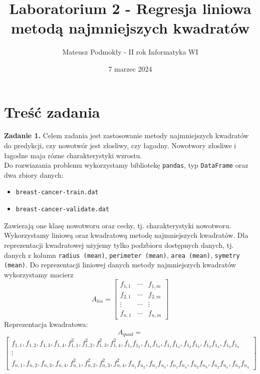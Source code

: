 \documentclass[11pt]{scrartcl}
\title{Laboratorium 2 - Regresja liniowa metodą najmniejszych kwadratów}
\author{Mateusz Podmokły - II rok Informatyka WI}
\date{7 marzec 2024}
\begin{document}
    \maketitle

    \section{Treść zadania}
    \textbf{Zadanie 1.} Celem zadania jest zastosowanie metody najmniejszych kwadratów
    do predykcji, czy nowotwór jest złosliwy, czy łagodny. Nowotwory złosliwe i łagodne
    maja rózne charakterystyki wzrostu. \\
    Do rozwiazania problemu wykorzystamy bibliotekę \texttt{pandas}, typ
    \texttt{DataFrame} oraz dwa zbiory danych:
    \begin{itemize}[label=--]
        \item \texttt{breast-cancer-train.dat}
        \item \texttt{breast-cancer-validate.dat}
    \end{itemize}
    Zawierają one klasę nowotworu oraz cechy, tj. charakterystyki nowotworu. \\
    Wykorzystamy liniową oraz kwadratową metodę najmniejszych kwadratów. Dla
    reprezentacji kwadratowej użyjemy tylko podzbioru dostępnych danych, tj.
    danych z kolumn \texttt{radius (mean)}, \texttt{perimeter (mean)},
    \texttt{area (mean)}, \texttt{symetry (mean)}. Do reprezentacji liniowej
    danych metody najmniejszych kwadratów wykorzystamy macierz
    \[
        A_{lin}=
        \begin{bmatrix}
            f_{1,1} & \cdots & f_{1,m} \\
            f_{2,1} & \cdots & f_{2,m} \\
            \vdots & \cdots  & \vdots \\
            f_{n,1} & \cdots & f_{n,m}
        \end{bmatrix}
    \]
    Reprezentacja kwadratowa:
    \[
        A_{quad}=
    \]
    \[
        \begin{bmatrix}
            f_{1,1}, f_{1,2}, f_{1,3}, f_{1,4},
            f_{1,1}^2, f_{1,2}^2, f_{1,3}^2, f_{1,4}^2,
            f_{1_1}f_{1_2}, f_{1_1}f_{1_3}, f_{1_1}f_{1_4},
            f_{1_2}f_{1_3}, f_{1_2}f_{1_4}, f_{1_3}f_{1_4} \\
            \vdots \\
            f_{n,1}, f_{n,2}, f_{n,3}, f_{n,4},
            f_{n,1}^2, f_{n,2}^2, f_{n,3}^2, f_{n,4}^2,
            f_{n_1}f_{n_2}, f_{n_1}f_{n_3}, f_{n_1}f_{n_4},
            f_{n_2}f_{n_3}, f_{n_2}f_{n_4}, f_{n_3}f_{n_4}
        \end{bmatrix}
    \]
\end{document}
